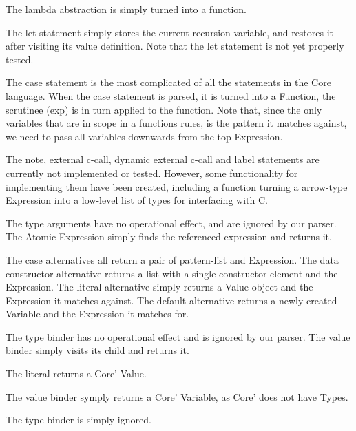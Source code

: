 The lambda abstraction is simply turned into a function.

The let statement simply stores the current recursion variable, and restores it after
visiting its value definition. Note that the let statement is not yet properly tested.

The case statement is the most complicated of all the statements in the Core language.
When the case statement is parsed, it is turned into a Function, the scrutinee (exp) 
is in turn applied to the function. Note that, since the only variables that are in
scope in a functions rules, is the pattern it matches against, we need to pass all 
variables downwards from the top Expression.

The note, external c-call, dynamic external c-call and label statements are currently
not implemented or tested. However, some functionality for implementing them have been
created, including a function turning a arrow-type Expression into a low-level list
of types for interfacing with C.


The type arguments have no operational effect, and are ignored by our parser.
The Atomic Expression simply finds the referenced expression and returns it.


The case alternatives all return a pair of pattern-list and Expression. The
data constructor alternative returns a list with a single constructor element and
the Expression. The literal alternative simply returns a Value object and the 
Expression it matches against. The default alternative returns a newly created
Variable and the Expression it matches for.


The type binder has no operational effect and is ignored by our parser. The 
value binder simply visits its child and returns it.


The literal returns a Core' Value.



The value binder symply returns a Core' Variable, as Core' does not have Types.



The type binder is simply ignored.


